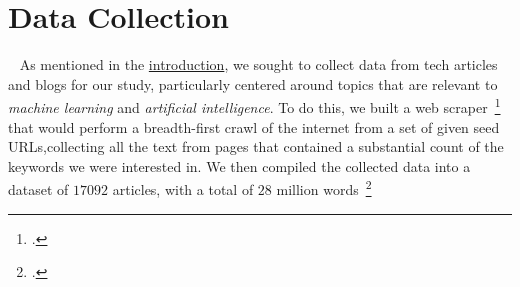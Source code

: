 \section{Data Collection}~\label{sec:data-collection}
As mentioned in the \hyperref[sec:introduction]{introduction},
we sought to collect data from tech articles and blogs for our study, particularly
centered around topics that are relevant to \emph{machine learning} and \emph{artificial intelligence}.
To do this, we built a web scraper~\footcite[The source-code is available on GitHub; see ][]{functional-scraper}
that would perform a breadth-first crawl of the internet from
a set of given seed URLs,collecting all the text from pages that contained
a substantial count of the keywords we were interested in.
We then compiled the collected data into a dataset of
$17092$ articles, with a total of $28$ million
words~\footcite[The dataset is available on Huggingface; see ][]{ai_dataset_2023}

